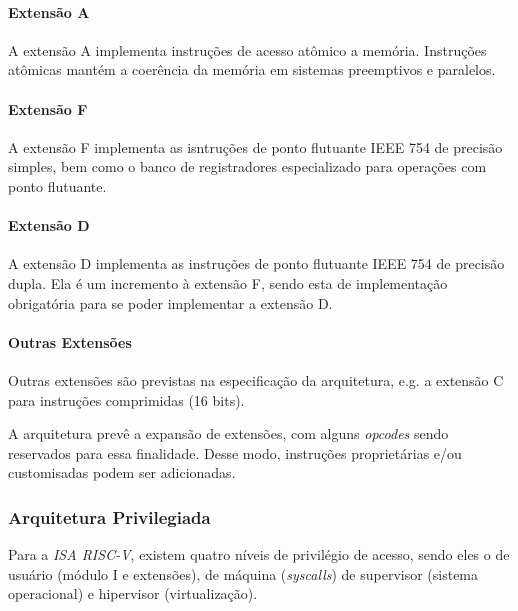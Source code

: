             \paragraph{Extensão A}
            {
                A extensão A implementa instruções de acesso atômico a memória.
                Instruções atômicas mantém a coerência da memória em sistemas
                preemptivos e paralelos.
            }

            \paragraph{Extensão F}
            {
                A extensão F implementa as isntruções de ponto flutuante IEEE 754 de
                precisão simples, bem como o banco de registradores especializado para
                operações com ponto flutuante.
            }

            \paragraph{Extensão D}
            {
                A extensão D implementa as instruções de ponto flutuante IEEE 754 de
                precisão dupla. Ela é um incremento à extensão F, sendo esta de
                implementação obrigatória para se poder implementar a extensão D.
            }

            \paragraph{Outras Extensões}
            {
                Outras extensões são previstas na especificação da arquitetura, e.g.
                a extensão C para instruções comprimidas (16 bits).
            }

            {
                A arquitetura prevê a expansão de extensões, com alguns
                \textit{opcodes} sendo reservados para essa finalidade. Desse modo,
                instruções proprietárias e/ou customisadas podem ser adicionadas.
            }

        \subsubsection{Arquitetura Privilegiada}
        {
            Para a \textit{ISA RISC-V}, existem quatro níveis de privilégio de acesso,
            sendo eles o de usuário (módulo I e extensões), de máquina
            (\textit{syscalls}) de supervisor (sistema operacional) e hipervisor
            (virtualização).
        }

